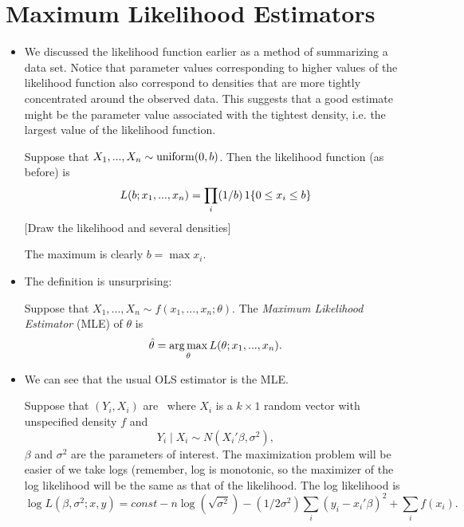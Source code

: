 \section{Maximum Likelihood Estimators}

\begin{itemize}[leftmargin=0pt]

\item We discussed the likelihood function earlier as a method of
  summarizing a data set.  Notice that parameter values corresponding
  to higher values of the likelihood function also correspond to
  densities that are more tightly concentrated around the observed
  data.  This suggests that a good estimate might be the parameter
  value associated with the tightest density, i.e. the largest value
  of the likelihood function.

  \begin{ex} Suppose that $X_1,...,X_n \sim \operatorname{uniform}(0, b)$.  Then the
    likelihood function (as before) is
    \begin{equation*}
      L(b; x_1,...,x_n) = \prod_i (1/b) \operatorname{1}\{0 \leq x_i \leq b\}
    \end{equation*}
    [Draw the likelihood and several densities]

    The maximum is clearly $b = \max x_i$.
  \end{ex}

\item The definition is unsurprising:
  \begin{defn}
    Suppose that $X_1,...,X_n \sim f(x_1,...,x_n; \theta)$.  The \emph{Maximum
      Likelihood Estimator} (MLE) of $\theta$ is
    \begin{equation*}
      \hat{\theta} = \operatorname*{arg\,max}_\theta L(\theta; x_1,...,x_n).
    \end{equation*}
  \end{defn}

\item We can see that the usual OLS estimator is the MLE.
  \begin{ex} Suppose that $(Y_i,X_i)$ are \iid\ where $X_i$ is a $k \times
    1$ random vector with unspecified density $f$ and
    \begin{equation*}
      Y_i \mid X_i \sim N(X_i'\beta, \sigma^2),
    \end{equation*}
    $\beta$ and $\sigma^2$ are the parameters of interest.  The maximization
    problem will be easier of we take logs (remember, log is
    monotonic, so the maximizer of the log likelihood will be the same
    as that of the likelihood.  The log likelihood is
    \begin{equation*}
      \log L(\beta,\sigma^2; x, y) = const - n\log (\sqrt{\sigma^2}) -
      (1/2\sigma^2) \sum_i (y_i - x_i'\beta)^2 + \sum_i f(x_i).
    \end{equation*}
    

\end{ex}
\end{itemize}
